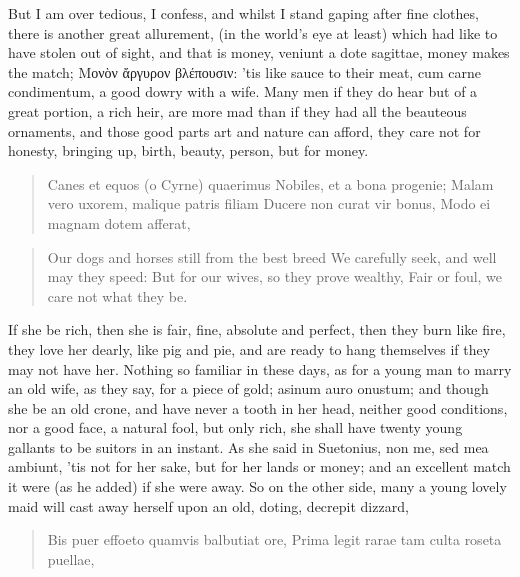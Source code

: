 But I am over tedious, I confess, and whilst I stand gaping after fine
clothes, there is another great allurement, (in the world's eye at
least) which had like to have stolen out of sight, and that is money,
veniunt a dote sagittae, money makes the match; \textgreek{Μονὸν ἄργυρον
βλέπουσιν}: 'tis like sauce to their meat, cum carne condimentum, a good
dowry with a wife. Many men if they do hear but of a great portion, a
rich heir, are more mad than if they had all the beauteous ornaments,
and those good parts art and nature can afford, they care not for
honesty, bringing up, birth, beauty, person, but for money.

\begin{latin}
\begin{verse}%
Canes et equos (o Cyrne) quaerimus
Nobiles, et a bona progenie;
Malam vero uxorem, malique patris filiam
Ducere non curat vir bonus,
Modo ei magnam dotem afferat,
\end{verse}%
\end{latin}
\translationrule%
\begin{verse}%
Our dogs and horses still from the best breed
We carefully seek, and well may they speed:
But for our wives, so they prove wealthy,
Fair or foul, we care not what they be.
\end{verse}%

If she be rich, then she is fair, fine, absolute and perfect, then they
burn like fire, they love her dearly, like pig and pie, and are ready
to hang themselves if they may not have her. Nothing so familiar in
these days, as for a young man to marry an old wife, as they say, for a
piece of gold; asinum auro onustum; and though she be an old crone, and
have never a tooth in her head, neither good conditions, nor a good
face, a natural fool, but only rich, she shall have twenty young
gallants to be suitors in an instant. As she said in Suetonius, non me,
sed mea ambiunt, 'tis not for her sake, but for her lands or money; and
an excellent match it were (as he added) if she were away. So on the
other side, many a young lovely maid will cast away herself upon an
old, doting, decrepit dizzard,

\begin{latin}
\begin{verse}%
Bis puer effoeto quamvis balbutiat ore,
Prima legit rarae tam culta roseta puellae,
\end{verse}%
\end{latin}


